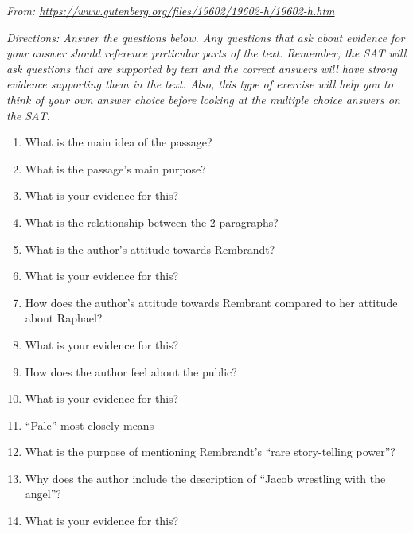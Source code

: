 \textit{From: \url{https://www.gutenberg.org/files/19602/19602-h/19602-h.htm}}

\bigskip
\textit{Directions: Answer the questions below. Any questions that ask about evidence for your answer should reference particular parts of the text. Remember, the SAT will ask questions that are supported by text and the correct answers will have strong evidence supporting them in the text. Also, this type of exercise will help you to think of your own answer choice before looking at the multiple choice answers on the SAT.}

\begin{enumerate}
\item What is the main idea of the passage? \hrulefill

\item What is the passage's main purpose? \hrulefill

\item What is your evidence for this? \hrulefill

\item What is the relationship between the 2 paragraphs? \hrulefill

\item What is the author's attitude towards Rembrandt? \hrulefill

\item What is your evidence for this? \hrulefill

\item How does the author's attitude towards Rembrant compared to her attitude about Raphael? \hrulefill

\item What is your evidence for this? \hrulefill

\item How does the author feel about the public? \hrulefill

\item What is your evidence for this? \hrulefill

\item ``Pale'' most closely means \hrulefill

\item What is the purpose of mentioning Rembrandt's ``rare story-telling power''? \hrulefill

\item Why does the author include the description of ``Jacob wrestling with the angel''? \hrulefill

\item What is your evidence for this? \hrulefill
\end{enumerate}